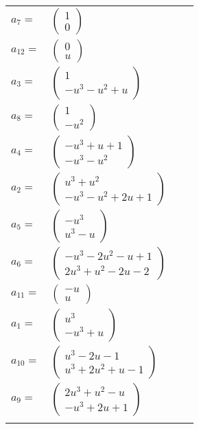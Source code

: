 \documentclass[1p]{elsarticle_modified}
\theoremstyle{definition}
\begin{document}
\begin{tabular}{m{7pt} m{180pt} m{7pt} m{180pt} }
\flushright $a_{7}=$&$\begin{pmatrix}1\\0\end{pmatrix}$ \\
\flushright $a_{12}=$&$\begin{pmatrix}0\\u\end{pmatrix}$ \\
\flushright $a_{3}=$&$\begin{pmatrix}1\\- u^3- u^2+u\end{pmatrix}$ \\
\flushright $a_{8}=$&$\begin{pmatrix}1\\- u^2\end{pmatrix}$ \\
\flushright $a_{4}=$&$\begin{pmatrix}- u^3+u+1\\- u^3- u^2\end{pmatrix}$ \\
\flushright $a_{2}=$&$\begin{pmatrix}u^3+u^2\\- u^3- u^2+2 u+1\end{pmatrix}$ \\
\flushright $a_{5}=$&$\begin{pmatrix}- u^3\\u^3- u\end{pmatrix}$ \\
\flushright $a_{6}=$&$\begin{pmatrix}- u^3-2 u^2- u+1\\2 u^3+u^2-2 u-2\end{pmatrix}$ \\
\flushright $a_{11}=$&$\begin{pmatrix}- u\\u\end{pmatrix}$ \\
\flushright $a_{1}=$&$\begin{pmatrix}u^3\\- u^3+u\end{pmatrix}$ \\
\flushright $a_{10}=$&$\begin{pmatrix}u^3-2 u-1\\u^3+2 u^2+u-1\end{pmatrix}$ \\
\flushright $a_{9}=$&$\begin{pmatrix}2 u^3+u^2- u\\- u^3+2 u+1\end{pmatrix}$\\&\end{tabular}
\end{document}
